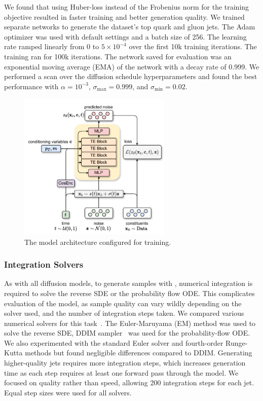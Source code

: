 We found that using Huber-loss\cite{SmoothL1} instead of the Frobenius norm for the training objective resulted in faster training and better generation quality.
We trained separate networks to generate the dataset's top quark and gluon jets.
The Adam optimizer was used with default settings and a batch size of 256.
The learning rate ramped linearly from 0 to $5 \times 10^{-4}$ over the first 10k training iterations.
The training ran for 100k iterations.
The network saved for evaluation was an exponential moving average (EMA) of the network with a decay rate of 0.999.
We performed a scan over the diffusion schedule hyperparameters and found the best performance with $\alpha=10^{-3}$, $\sigma_\text{max}=0.999$, and $\sigma_\text{min}=0.02$.

\begin{figure}
    \centering
    \includegraphics[width=0.65\textwidth]{Figures/jet_generation/pcjedi.pdf}
    \caption{The \pcjedi model architecture configured for training.}
    \label{fig:pcjedi}
\end{figure}

\subsubsection{Integration Solvers}

As with all diffusion models, to generate samples with \pcjedi, numerical integration is required to solve the reverse SDE or the probability flow ODE.
This complicates evaluation of the model, as sample quality can vary wildly depending on the solver used, and the number of integration steps taken.
We compared various numerical solvers for this task~\cite{NumericalSolutionStochastic}.
The Euler-Maruyama (EM) method was used to solve the reverse SDE, DDIM sampler~\cite{DDIM} was used for the probability-flow ODE.
We also experimented with the standard Euler solver and fourth-order Runge-Kutta methods but found negligible differences compared to DDIM.
Generating higher-quality jets requires more integration steps, which increases generation time as each step requires at least one forward pass through the model.
We focused on quality rather than speed, allowing 200 integration steps for each jet.
Equal step sizes were used for all solvers.

